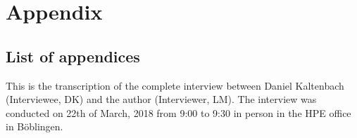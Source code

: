\chapter*{Appendix}
\section*{List of appendices}
\vspace{-8em}
\listofanhang
\clearpage
{} %

\label{Interviews}





\label{anhang:InterviewDK}
This is the transcription of the complete interview between Daniel Kaltenbach (Interviewee, DK) and the author (Interviewer, LM). The interview was conducted on 22th of March, 2018 from 9:00 to 9:30 in person in the HPE office in Böblingen. 

